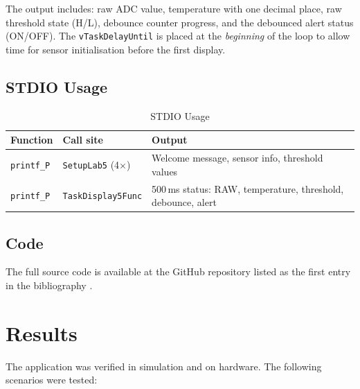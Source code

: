 \documentclass[12pt]{article}
\begin{document}
The output includes: raw ADC value, temperature with one decimal place, raw threshold state (H/L), debounce counter progress, and the debounced alert status (ON/OFF). The \texttt{vTaskDelayUntil} is placed at the \emph{beginning} of the loop to allow time for sensor initialisation before the first display.

\subsection{STDIO Usage}

\begin{table}[H]
\centering
\begin{tabular}{@{}lp{4cm}p{5.5cm}@{}}
\toprule
\textbf{Function} & \textbf{Call site} & \textbf{Output} \\
\midrule
\texttt{printf\_P}
  & \texttt{SetupLab5} (4$\times$)
  & Welcome message, sensor info, threshold values \\
\texttt{printf\_P}
  & \texttt{TaskDisplay5Func}
  & 500\,ms status: RAW, temperature, threshold, debounce, alert \\
\bottomrule
\end{tabular}
\caption{STDIO Usage}
\label{tab:stdio}
\end{table}

\subsection{Code}

The full source code is available at the GitHub repository listed as the first entry in the bibliography \cite{code}.

\section{Results}

The application was verified in simulation and on hardware. The following scenarios were tested:
\end{document}
